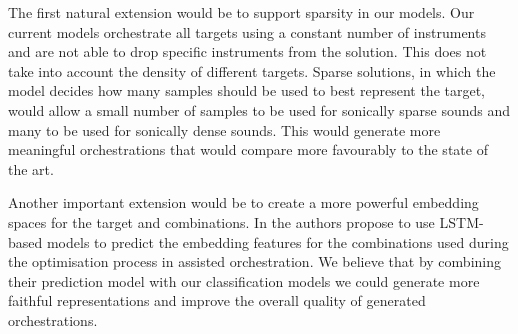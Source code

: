 \documentclass[runningheads,a4paper]{llncs}
\begin{document}
The first natural extension would be to support sparsity in our models. Our current models orchestrate all targets using a constant number of instruments and are not able to drop specific instruments from the solution. This does not take into account the density of different targets. Sparse solutions, in which the model decides how many samples should be used to best represent the target, would allow a small number of samples to be used for sonically sparse sounds and many to be used for sonically dense sounds. This would generate more meaningful orchestrations that would compare more favourably to the state of the art.

Another important extension would be to create a more powerful embedding spaces for the target and combinations. In \cite{Gillick19} the authors propose to use LSTM-based models to predict the embedding features for the combinations used during the optimisation process in assisted orchestration. We believe that by combining their prediction model with our classification models we could generate more faithful representations and improve the overall quality of generated orchestrations.



\end{document}
